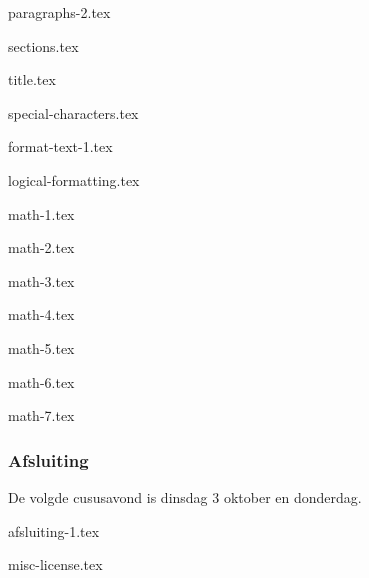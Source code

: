 \documentclass[allauthors,dutch]{../../cursuspresentatie}
\def\importslide#1#2{%
	{#2}
}
\begin{document}
\importslide{beginners_NL}{paragraphs-2.tex}


\importslide{beginners_NL}{sections.tex}


\importslide{beginners_NL}{title.tex}


\importslide{beginners_NL}{special-characters.tex}


\importslide{beginners_NL}{format-text-1.tex}

\importslide{beginners_NL}{logical-formatting.tex}



\importslide{beginners_NL}{math-1.tex}

\importslide{beginners_NL}{math-2.tex}


\importslide{beginners_NL}{math-3.tex}

\importslide{beginners_NL}{math-4.tex}

\importslide{beginners_NL}{math-5.tex}

\importslide{beginners_NL}{math-6.tex}

\importslide{beginners_NL}{math-7.tex}



\begin{frame}
	\frametitle{Afsluiting}
	
	De volgde cususavond is dinsdag 3 oktober en donderdag.
\end{frame}
{afsluiting-1.tex}
	
{misc-license.tex}
\end{document}
